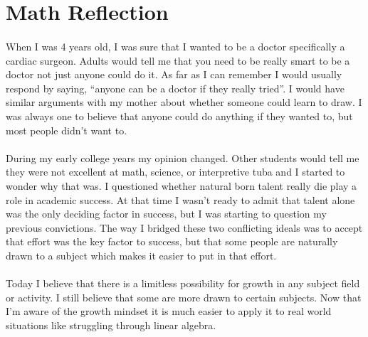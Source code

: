 \documentclass{article}
\begin{document}
  \section*{Math Reflection}
    \paragraph{}
    When I was 4 years old, I was sure that I wanted to be a doctor specifically a cardiac surgeon. Adults would tell me that you need to be really smart to be a doctor not just anyone could do it. As far as I can remember I would usually respond by saying, ``anyone can be a doctor if they really tried''. I would have similar arguments with my mother about whether someone could learn to draw. I was always one to believe that anyone could do anything if they wanted to, but most people didn't want to.

    \paragraph{}
    During my early college years my opinion changed. Other students would tell me they were not excellent at math, science, or interpretive tuba and I started to wonder why that was. I questioned whether natural born talent really die play a role in academic success. At that time I wasn't ready to admit that talent alone was the only deciding factor in success, but I was starting to question my previous convictions. The way I bridged these two conflicting ideals was to accept that effort was the key factor to success, but that some people are naturally drawn to a subject which makes it easier to put in that effort.

    \paragraph{}
    Today I believe that there is a limitless possibility for growth in any subject field or activity. I still believe that some are more drawn to certain subjects. Now that I'm aware of the growth mindset it is much easier to apply it to real world situations like struggling through linear algebra.
    
  
\end{document}
